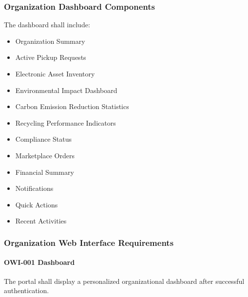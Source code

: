 
\subsubsection*{Organization Dashboard Components}

The dashboard shall include:

\begin{itemize}

\item Organization Summary

\item Active Pickup Requests

\item Electronic Asset Inventory

\item Environmental Impact Dashboard

\item Carbon Emission Reduction Statistics

\item Recycling Performance Indicators

\item Compliance Status

\item Marketplace Orders

\item Financial Summary

\item Notifications

\item Quick Actions

\item Recent Activities

\end{itemize}


\subsubsection*{Organization Web Interface Requirements}

\paragraph{OWI-001 Dashboard}

The portal shall display a personalized organizational dashboard after
successful authentication.

